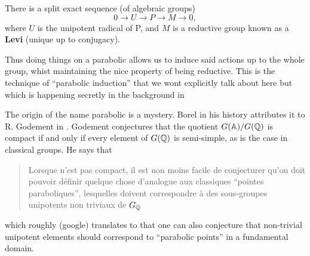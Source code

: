 \begin{Lemma}
    There is a split exact sequence (of algebraic groups)
    \[0 \to U \to P \to M \to 0,\]
    where \(U\) is the unipotent radical of P, and \(M\) is a reductive group known as a \textbf{Levi} (unique up to conjugacy).
\end{Lemma}

Thus doing things on a parabolic allows us to induce said actions up to the whole group, whist maintaining the nice property of being reductive. This is the technique of ``parabolic induction''  that we wont explicitly talk about here but which is happening secretly in the background in 

\begin{Remark}
    The origin of the name parabolic is a mystery. Borel in his history \cite[VI.\S 2]{EssaysHistoryLie} attributes it to R. Godement in \cite{godementGroupesLineairesAlgebriques}. Godement conjectures that the quotient \(G(\A) / G(\Q)\) is compact if and only if every element of \(G(\Q)\) is semi-simple, as is the case in classical groups.  He says that 
    \begin{quote}
        Lorsque n'est pas compact, il est non moins facile de conjecturer qu’on doit pouvoir définir quelque chose d’analogue aux classiques ``pointes paraboliques'', lesquelles doivent correspondre à des  sous-groupes unipotents non triviaux de \(G_\Q\)
    \end{quote}
    which roughly (google) translates to that one can also conjecture that non-trivial unipotent elements should correspond to ``parabolic points'' in a fundamental domain.


\end{Remark}
